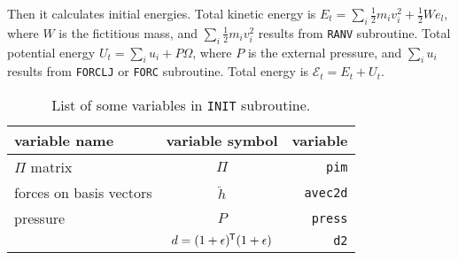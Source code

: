 Then it calculates initial energies.
Total kinetic energy is $E_t = \sum_{i} \frac{ 1 }{ 2 } m_i v_i^2 + \frac{ 1 }{ 2 } W e_l$,
where $W$ is the fictitious mass, and $\sum_{i} \frac{ 1 }{ 2 } m_i v_i^2$
results from \texttt{RANV} subroutine.
Total potential energy $U_{t} = \sum_{i} u_i + P \Omega$, where $P$ is the external pressure,
and $\sum_{i} u_i$ results from \texttt{FORCLJ} or \texttt{FORC} subroutine.
Total energy is $\mathscr{E}_{t} = E_t + U_{t}$.

\begin{table}[h]
	\centering
	\caption{List of some variables in \texttt{INIT} subroutine.}
	\begin{tabular}{@{}lcr@{}}
		\toprule
		variable name           & variable symbol                       & variable        \\
		\midrule
		$\Pi$ matrix            & $\Pi$                                 & \texttt{pim}    \\
		forces on basis vectors & $\ddot{h}$                            & \texttt{avec2d} \\
		pressure                & $P$                                   & \texttt{press}  \\
		                        & $d = (1 + \epsilon)^{\mkern-1.5mu\mathsf{T}}(1+\epsilon)$ & \texttt{d2}     \\
		\bottomrule
	\end{tabular}%
	\label{tab:init}%
\end{table}%
